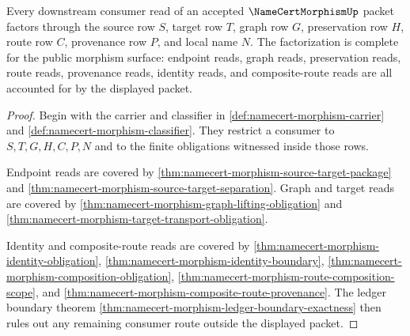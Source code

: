 \begin{theorem}
\label{thm:namecert-morphism-mature-consumer-completeness}
Every downstream consumer read of an accepted $\NameCertMorphismUp$ packet factors through the source row $S$, target row $T$, graph row $G$, preservation row $H$, route row $C$, provenance row $P$, and local name $N$. The factorization is complete for the public morphism surface: endpoint reads, graph reads, preservation reads, route reads, provenance reads, identity reads, and composite-route reads are all accounted for by the displayed packet.
\end{theorem}
\begin{proof}
Begin with the carrier and classifier in \autoref{def:namecert-morphism-carrier} and \autoref{def:namecert-morphism-classifier}. They restrict a consumer to $S,T,G,H,C,P,N$ and to the finite obligations witnessed inside those rows.

Endpoint reads are covered by \autoref{thm:namecert-morphism-source-target-package} and \autoref{thm:namecert-morphism-source-target-separation}. Graph and target reads are covered by \autoref{thm:namecert-morphism-graph-lifting-obligation} and \autoref{thm:namecert-morphism-target-transport-obligation}.

Identity and composite-route reads are covered by \autoref{thm:namecert-morphism-identity-obligation}, \autoref{thm:namecert-morphism-identity-boundary}, \autoref{thm:namecert-morphism-composition-obligation}, \autoref{thm:namecert-morphism-route-composition-scope}, and \autoref{thm:namecert-morphism-composite-route-provenance}. The ledger boundary theorem \autoref{thm:namecert-morphism-ledger-boundary-exactness} then rules out any remaining consumer route outside the displayed packet.
\end{proof}

